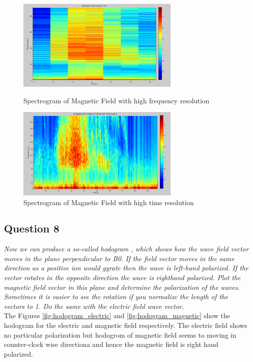\documentclass{article}
\begin{document}
\begin{figure}[htb!]
\begin{minipage}[c]{0.5\linewidth}
\centering
\includegraphics[width=8cm]{Figures/spectrogram_magnetic_highF.png}
\caption{Spectrogram of Magnetic Field with high frequency resolution}
\label{fig:spectrogram_magnetic_highF}
\end{minipage}
\hspace{0.1cm}
\begin{minipage}[c]{0.5\linewidth}
\centering
\includegraphics[width=8cm]{Figures/spectrogram_magnetic_highT.png}
\caption{Spectrogram of Magnetic Field with high time resolution}
\label{fig:spectrogram_magnetic_highT}
\end{minipage}
\end{figure}

\subsection{Question 8}
\textit{Now we can produce a so-called hodogram , which shows how the wave field vector moves in the plane perpendicular to B0. If the field vector moves in the same direction as a positive ion would gyrate then the wave is left-hand polarized. If the vector rotates in the opposite direction the wave is righthand polarized. Plot the magnetic field vector in this plane and determine the polarization of the waves. Sometimes it is easier to see the rotation if you normalize the length of the vectors to 1. Do the same with the electric field wave vector.}\\

The Figures \ref{fig:hodogram_electric} and \ref{fig:hodogram_magnetic} show the hodogram for the electric and magnetic field respectively. The electric field shows no particular polarization but hodogrom of magnetic field seems to moving in counter-clock wise directiona and hence the magnetic field is right hand polarized.
\end{document}
